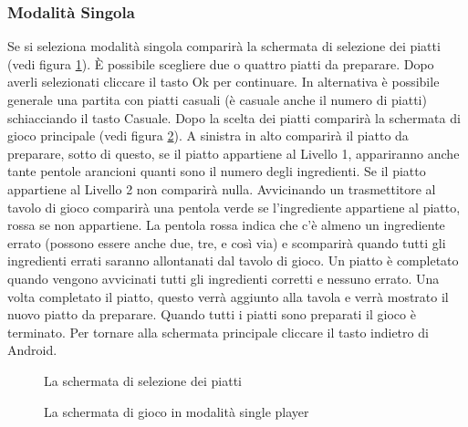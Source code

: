 \subsubsection{Modalità Singola}

Se si seleziona modalità singola comparirà la schermata di selezione dei piatti (vedi figura \ref{fig:screen1}). È possibile scegliere due o quattro piatti da preparare. Dopo averli selezionati cliccare il tasto Ok per continuare. In alternativa è possibile generale una partita con piatti casuali (è casuale anche il numero di piatti) schiacciando il tasto Casuale.
Dopo la scelta dei piatti comparirà la schermata di gioco principale (vedi figura \ref{fig:screen2}). A sinistra in alto comparirà il piatto da preparare, sotto di questo, se il piatto appartiene al Livello 1, appariranno anche tante pentole arancioni quanti sono il numero degli ingredienti. Se il piatto appartiene al Livello 2 non comparirà nulla. 
Avvicinando un trasmettitore al tavolo di gioco comparirà una pentola verde se l’ingrediente appartiene al piatto, rossa se non appartiene. La pentola rossa indica che c’è almeno un ingrediente errato (possono essere anche due, tre, e così via) e scomparirà quando tutti gli ingredienti errati saranno allontanati dal tavolo di gioco. Un piatto è completato quando vengono avvicinati tutti gli ingredienti corretti e nessuno errato.
Una volta completato il piatto, questo verrà aggiunto alla tavola e verrà mostrato il nuovo piatto da preparare. Quando tutti i piatti sono preparati il gioco è terminato. Per tornare alla schermata principale cliccare il tasto indietro di Android.

\begin{figure}[h!]
\caption{La schermata di selezione dei piatti}
\label{fig:screen1}
\end{figure}

\begin{figure}[h!]
\caption{La schermata di gioco in modalità single player}
\label{fig:screen2}
\end{figure}


